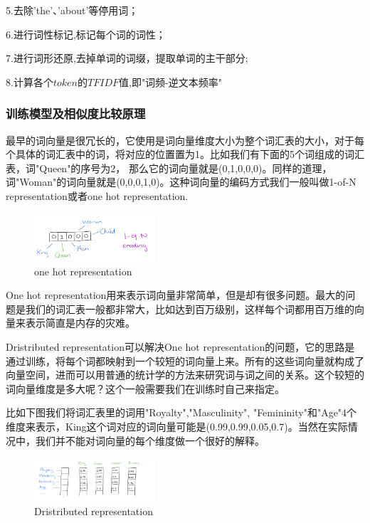 \documentclass[UTF8,a4paper,10pt, twocolumn]{ctexart}
\begin{document}
5.去除'the'、'about'等停用词；

6.进行词性标记,标记每个词的词性；

7.进行词形还原,去掉单词的词缀，提取单词的主干部分;

8.计算各个$token$的$TFIDF$值,即"词频-逆文本频率"

\subsubsection{训练模型及相似度比较原理}
最早的词向量是很冗长的，它使用是词向量维度大小为整个词汇表的大小，对于每个具体的词汇表中的词，将对应的位置置为1。比如我们有下面的5个词组成的词汇表，词"Queen"的序号为2， 那么它的词向量就是(0,1,0,0,0)。同样的道理，词"Woman"的词向量就是(0,0,0,1,0)。这种词向量的编码方式我们一般叫做1-of-N representation或者one hot representation.

\begin{figure}[htbp]
  \centering
  \includegraphics[width=0.4\textwidth]{img/fig8.png}
  \caption{one hot representation}
  \label{figure:zju6}
  \end{figure}

One hot representation用来表示词向量非常简单，但是却有很多问题。最大的问题是我们的词汇表一般都非常大，比如达到百万级别，这样每个词都用百万维的向量来表示简直是内存的灾难。

Dristributed representation可以解决One hot representation的问题，它的思路是通过训练，将每个词都映射到一个较短的词向量上来。所有的这些词向量就构成了向量空间，进而可以用普通的统计学的方法来研究词与词之间的关系。这个较短的词向量维度是多大呢？这个一般需要我们在训练时自己来指定。

比如下图我们将词汇表里的词用"Royalty","Masculinity", "Femininity"和"Age"4个维度来表示，King这个词对应的词向量可能是(0.99,0.99,0.05,0.7)。当然在实际情况中，我们并不能对词向量的每个维度做一个很好的解释。

\begin{figure}[htbp]
  \centering
  \includegraphics[width=0.4\textwidth]{img/fig9.png}
  \caption{Dristributed representation}
  \label{figure:zju7}
  \end{figure}
\end{document}

